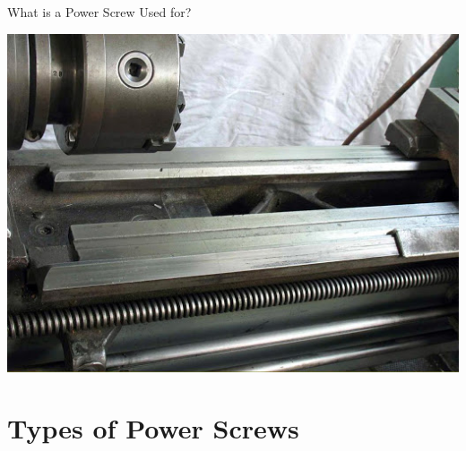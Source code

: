 \documentclass[10pt, svgnames]{beamer}
\begin{document}
\begin{frame}[label={sec:orgb7b33fe}]{What is a Power Screw Used for?}
\begin{center}
\includegraphics[width=.9\linewidth]{pictures/screw-in-lathe.jpg}
\end{center}
\end{frame}

\section{Types of Power Screws}
\label{sec:org7943fbc}
\end{document}
